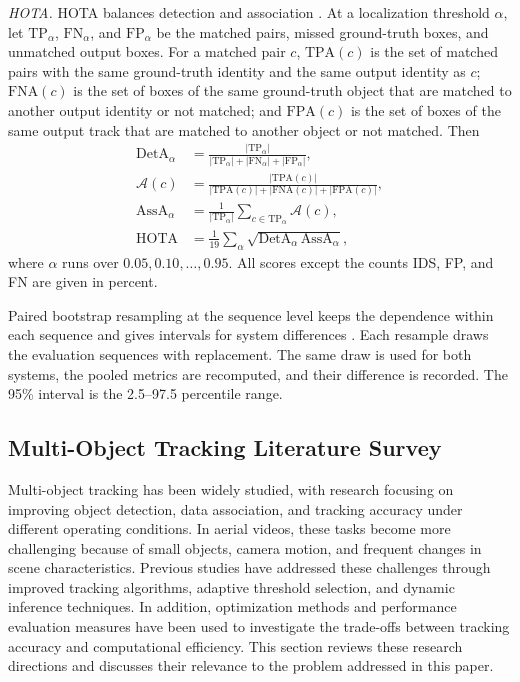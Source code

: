 \documentclass[pdflatex,sn-mathphys-num,iicol]{sn-jnl}
\begin{document}
\emph{HOTA.} HOTA balances detection and association \cite{luiten2021hota}.
At a localization threshold $\alpha$, let $\mathrm{TP}_\alpha$,
$\mathrm{FN}_\alpha$, and $\mathrm{FP}_\alpha$ be the matched pairs, missed
ground-truth boxes, and unmatched output boxes. For a matched pair $c$,
$\mathrm{TPA}(c)$ is the set of matched pairs with the same ground-truth
identity and the same output identity as $c$; $\mathrm{FNA}(c)$ is the set of
boxes of the same ground-truth object that are matched to another output
identity or not matched; and $\mathrm{FPA}(c)$ is the set of boxes of the same
output track that are matched to another object or not matched. Then
\begin{align}
\mathrm{DetA}_\alpha&=\frac{|\mathrm{TP}_\alpha|}{|\mathrm{TP}_\alpha|+|\mathrm{FN}_\alpha|+|\mathrm{FP}_\alpha|},\label{eq:deta}\\
\mathcal{A}(c)&=\frac{|\mathrm{TPA}(c)|}{|\mathrm{TPA}(c)|+|\mathrm{FNA}(c)|+|\mathrm{FPA}(c)|},\label{eq:ac}\\
\mathrm{AssA}_\alpha&=\frac{1}{|\mathrm{TP}_\alpha|}\sum_{c\in\mathrm{TP}_\alpha}\mathcal{A}(c),\label{eq:assa}\\
\mathrm{HOTA}&=\frac{1}{19}\sum_{\alpha}\sqrt{\mathrm{DetA}_\alpha\,\mathrm{AssA}_\alpha},\label{eq:hota}
\end{align}
where $\alpha$ runs over $0.05, 0.10, \dots, 0.95$. All scores except the
counts IDS, FP, and FN are given in percent.

Paired bootstrap resampling at the sequence level keeps the dependence within
each sequence and gives intervals for system differences
\cite{efron1993bootstrap}. Each resample draws the evaluation sequences with
replacement. The same draw is used for both systems, the pooled metrics are
recomputed, and their difference is recorded. The 95\% interval is the
2.5--97.5 percentile range.

\subsection{Multi-Object Tracking Literature Survey}
Multi-object tracking has been widely studied, with research focusing on improving object detection, data association, and tracking accuracy under different operating conditions. In aerial videos, these tasks become more challenging because of small objects, camera motion, and frequent changes in scene characteristics. Previous studies have addressed these challenges through improved tracking algorithms, adaptive threshold selection, and dynamic inference techniques. In addition, optimization methods and performance evaluation measures have been used to investigate the trade-offs between tracking accuracy and computational efficiency. This section reviews these research directions and discusses their relevance to the problem addressed in this paper.
\end{document}
